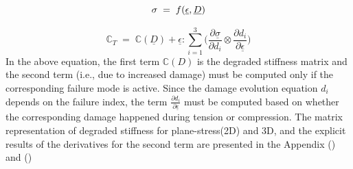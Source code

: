\documentclass[12pt,a4paper,twoside,openright]{report}
\begin{document}
\begin{equation*}
\large{\sigma  \; = \; f(\underline{ \epsilon}, \underline{D} ) }
\end{equation*}

\begin{equation}
\mathbb{C}_{T}  \; = \; \mathbb{C}(\underline{D}) + \underline{ \epsilon}  : \sum_{i = 1}^{3}  \Big( \frac{\partial \underline{\sigma} }{\partial d_{i}} \otimes \frac{\partial d_{i}}{\partial \underline{ \epsilon} }\Big)
\label{Anisotropic tangent stiffness} 
\end{equation}
In the above equation, the first term $\mathbb{C}(D)$ is the degraded stiffness matrix and the second term (i.e., due to increased damage) must be computed only if the corresponding failure mode is active. Since the damage evolution equation $d_{i}$ depends on the failure index, the term $\frac{\partial d_{i}}{\partial \underline{ \epsilon} }$ must be computed based on whether the corresponding damage happened during tension or compression. The matrix representation of degraded stiffness for plane-stress(2D) and 3D, and the explicit results of the derivatives for the second term are presented in the Appendix () and ()
\end{document}
